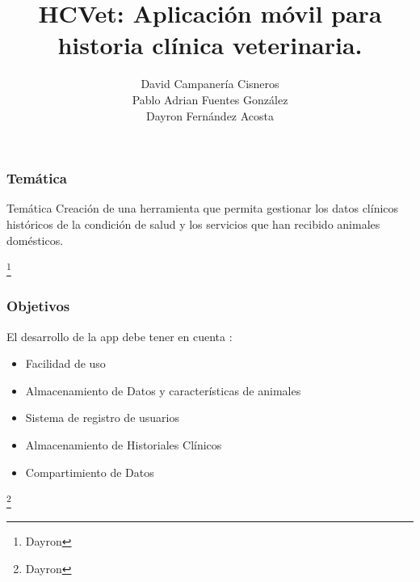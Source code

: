 \documentclass[14pt]{beamer}
\author[Campanería, Fernández, Fuentes]
{David Campanería Cisneros\\Pablo Adrian Fuentes González\\Dayron Fernández Acosta}
\title[Aplicación   HCVet]
{HCVet: Aplicación móvil para historia clínica veterinaria.}
\institute[UH]
{\textbf{Tutores:}\\ José Alejandro Mesejo Chiong\\ José Luis Castañeda Lorenzo}
\begin{document}
\begin{frame}
\titlepage
\end{frame}



\begin{frame}
\frametitle{Temática}
\begin{block}{Temática}
Creación de una herramienta que permita gestionar los datos clínicos históricos de la condición de salud y los servicios que han recibido animales domésticos.

\end{block}

\footnote{Dayron}
\end{frame}


\begin{frame}
\frametitle{Objetivos}
El desarrollo de la app debe tener en cuenta :
\begin{itemize}
\item Facilidad de uso
\item Almacenamiento de Datos y características de animales
\item Sistema de registro de usuarios
\item Almacenamiento de Historiales Clínicos
\item Compartimiento de Datos 


\end{itemize}
\footnote{Dayron}
\end{frame}
\end{document}
